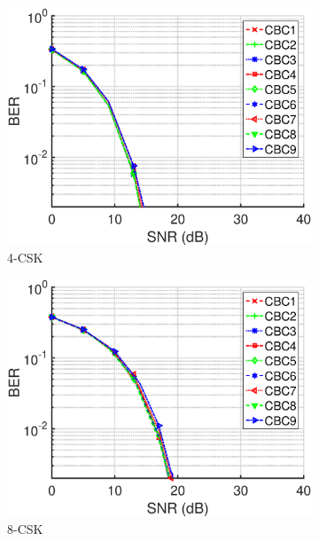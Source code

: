 \documentclass[10pt,letterpaper]{article}
\begin{document}
\begin{figure}[t]
	\centering
		\begin{subfigure}{0.32\textwidth}
		\centering
			\includegraphics[trim={0.1in 0.0in 0.6in 0.3in}, clip=true, width=\textwidth]{M04_4-CSK_BERvsSNR.eps}
			\caption{4-CSK}
			\label{fig4SNR}
		\end{subfigure}
		\hfill
		\begin{subfigure}{0.32\textwidth}
		\centering
			\includegraphics[trim={0.1in 0.0in 0.6in 0.3in}, clip=true, width=\textwidth]{M08_8-CSK_BERvsSNR.eps}
			\caption{8-CSK}
			\label{fig8SNR}
		\end{subfigure}
		\hfill
		\begin{subfigure}{0.32\textwidth}

\end{subfigure}
\end{figure}
\end{document}
